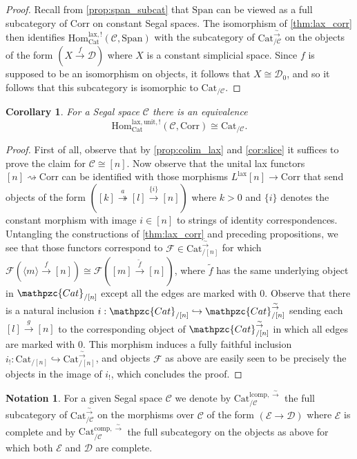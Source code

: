 \documentclass[a4paper, reqno]{amsart}
\newtheorem{cor}[theorem]{Corollary}
\theoremstyle{definition}
\newtheorem{notation}[theorem]{Notation}
\newcommand\cC{\mathscr C}
\newcommand\cD{\mathscr D}
\newcommand\cE{\mathscr E}
\newcommand\cF{\mathscr F}
\newcommand\mor{\mathrm{Hom}}
\newcommand\cat{\mathrm{Cat}}
\newcommand\comp{\mathrm{comp}}
\newcommand\lcomp{\mathrm{lcomp}}
\newcommand\ccat{\mathpzc{Cat}}
\newcommand\spanc{\mathrm{Span}}
\newcommand\corr{\mathrm{Corr}}
\newcommand\lax{\mathrm{lax}}
\newcommand\un{\mathrm{unit}}
\newcommand\bm{\langle m\rangle}
\newcommand\wrr{{\overset{\sim}{\rightarrow}}}
\begin{document}
\begin{proof}
Recall from \cref{prop:span_subcat} that $\spanc$ can be viewed as a full subcategory of $\corr$ on constant Segal spaces. The isomorphism of \cref{thm:lax_corr} then identifies $\mor_\cat^{\lax,!}(\cC,\spanc)$ with the subcategory of $\cat^\wrr_{/\cC}$ on the objects of the form $(X\xrightarrow{f}\cD)$ where $X$ is a constant simplicial space. Since $f$ is supposed to be an isomorphism on objects, it follows that $X\cong\cD_0$, and so it follows that this subcategory is isomorphic to $\cat_{/\cC}$.
\end{proof}
\begin{cor}
For a Segal space $\cC$ there is an equivalence
\[\mor_\cat^{\lax,\un,!}(\cC,\corr)\cong\cat_{/\cC}.\]
\end{cor}
\begin{proof}
First of all, observe that by \cref{prop:colim_lax} and \cref{cor:slice} it suffices to prove the claim for $\cC\cong[n]$. Now observe that the unital lax functors $[n]\rightsquigarrow\corr$ can be identified with those morphisms $L^\lax[n]\rightarrow\corr$ that send objects of the form $([k]\overset{a}{\twoheadrightarrow}[l]\xrightarrow{\{i\}}[n])$ where $k>0$ and $\{i\}$ denotes the constant morphism with image $i\in[n]$ to strings of identity correspondences. Untangling the constructions of \cref{thm:lax_corr} and preceding propositions, we see that those functors correspond to $\cF\in\cat^\wrr_{/[n]}$ for which $\cF(\bm\xrightarrow{f}[n])\cong\cF([m]\xrightarrow{\widetilde{f}}[n])$, where $\widetilde{f}$ has the same underlying object in $\ccat_{/[n]}$ except all the edges are marked with $0$. Observe that there is a natural inclusion $i:\ccat_{/[n]}\hookrightarrow\ccat^\wrr_{/[n]}$ sending each $[l]\xrightarrow{g}[n]$ to the corresponding object of $\ccat^\wrr_{/[n]}$ in which all edges are marked with $0$. This morphism induces a fully faithful inclusion $i_!:\cat_{/[n]}\hookrightarrow\cat^\wrr_{/[n]}$, and objects $\cF$ as above are easily seen to be precisely the objects in the image of $i_!$, which concludes the proof.
\end{proof}
\begin{notation}\label{not:comp}
For a given Segal space $\cC$ we denote by $\cat^{\lcomp,\wrr}_{/\cC}$ the full subcategory of $\cat^\wrr_{/\cC}$ on the morphisms over $\cC$ of the form $(\cE\rightarrow\cD)$ where $\cE$ is complete and by $\cat^{\comp,\wrr}_{/\cC}$ the full subcategory on the objects as above for which both $\cE$ and $\cD$ are complete.
\end{notation}
\end{document}

